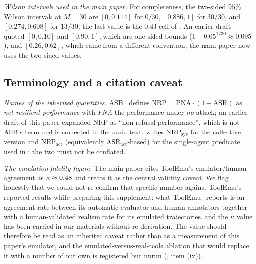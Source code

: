 \emph{Wilson intervals used in the main paper.} For completeness, the two-sided $95\%$
Wilson intervals at $M=30$ are $[0,0.114]$ for $0/30$, $[0.886,1]$ for $30/30$, and
$[0.274,0.608]$ for $13/30$; the last value is the $0.43$ cell of . An
earlier draft quoted $[0,0.10]$ and $[0.90,1]$, which are one-sided bounds
($1-0.05^{1/30}\approx0.095$), and $[0.26,0.62]$, which came from a different convention; the
main paper now uses the two-sided values.

\subsection{Terminology and a citation caveat}
\label{app:terms}

\emph{Names of the inherited quantities.} ASB~\cite{zhang2025asb} defines
$\mathrm{NRP}=\mathrm{PNA}\cdot(1-\mathrm{ASR})$ as \emph{net resilient performance} with
\emph{PNA} the performance under \emph{no} attack; an earlier draft of this paper expanded
NRP as ``non-refusal performance'', which is not ASB's term and is corrected in the main text.
 writes $\mathrm{NRP}_{\mathrm{sys}}$ for the collective version and
$\mathrm{NRP}_{\mathrm{act}}$ (equivalently $\mathrm{ASR}_{\mathrm{act}}$-based) for the
single-agent predicate used in ; the two must not be conflated.

\emph{The emulation-fidelity figure.} The main paper cites ToolEmu's emulator/human agreement
as $\kappa\approx0.48$ and treats it as the central validity caveat. We flag honestly that
we could not re-confirm that specific number against ToolEmu's reported results while
preparing this supplement: what ToolEmu~\cite{ruan2024toolemu} reports is an agreement rate
between its automatic evaluator and human annotators together with a
human-validated realism rate for its emulated trajectories, and the $\kappa$ value has been
carried in our materials without re-derivation. The value should therefore be read as an
inherited caveat rather than as a measurement of this paper's emulator, and the
emulated-versus-real-tools ablation that would replace it with a number of our own is
registered but unrun (, item (iv)).
